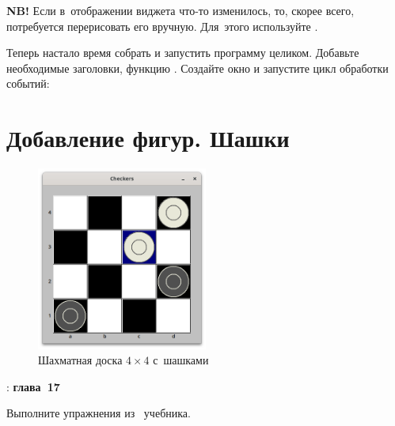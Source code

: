 
\noindent\textbf{NB!} Если в~отображении виджета что-то изменилось, то, скорее всего, потребуется перерисовать его вручную. Для~этого используйте .

Теперь настало время собрать и запустить программу целиком. Добавьте необходимые заголовки, функцию . Создайте окно  и запустите цикл обработки событий:




\section{Добавление фигур. Шашки}

\begin{figure}[ht]
    {\centering
        \includegraphics[width=0.5\textwidth]{images/checkers.png}

    }
    \caption{Шахматная доска \(4\times 4\) с~шашками}
    \label{fig:checkers}
\end{figure}




\WhatToReadSection
\textcite{Stroustrup:2016:ru}: \textbf{глава~17}



\ExercisesSection
\begin{exercise}
\item Выполните упражнения из~ учебника.

\end{exercise}
